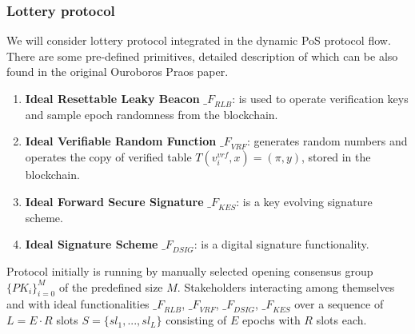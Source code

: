 \subsubsection{Lottery protocol}
We will consider lottery protocol integrated in the dynamic PoS protocol flow.
There are some pre-defined primitives, detailed description of which can be also found in the original Ouroboros Praos paper.
\begin{enumerate}
    \item \textbf{Ideal Resettable Leaky Beacon} ${\mathcal_{F}}_{RLB}$: is used to operate verification keys and sample epoch randomness from the blockchain.
    \item \textbf{Ideal Verifiable Random Function} ${\mathcal_{F}}_{VRF}$: generates random numbers and operates the copy of verified table ${T(v_i^{vrf}, x) = (\pi, {y})}$, stored in the blockchain.
    \item \textbf{Ideal Forward Secure Signature} ${\mathcal_{F}}_{KES}$: is a key evolving signature scheme.
    \item \textbf{Ideal Signature Scheme} ${\mathcal_{F}}_{DSIG}$: is a digital signature functionality.
\end{enumerate}
Protocol initially is running by manually selected opening consensus group $\{PK_i\}_{i=0}^M$ of the predefined size $M$.
Stakeholders interacting among themselves and with ideal functionalities ${\mathcal_{F}}_{RLB}$, ${\mathcal_{F}}_{VRF}$, ${\mathcal_{F}}_{DSIG}$, ${\mathcal_{F}}_{KES}$ over a sequence of $L = E \cdot R$ slots  ${S=\{sl_1,...,sl_L\}}$ consisting of $E$ epochs with $R$ slots each.
